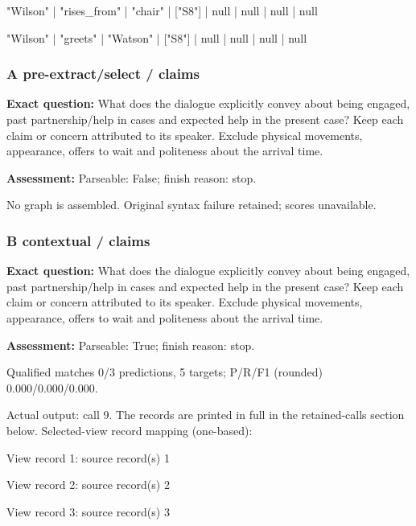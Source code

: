 "Wilson" | "rises\_from" | "chair" | ["S8"] | null | null | null | null\par\smallskip

"Wilson" | "greets" | "Watson" | ["S8"] | null | null | null | null\par\smallskip

\subsubsection*{A pre-extract/select / claims}

\noindent\textbf{Exact question:} What does the dialogue explicitly convey about being engaged, past partnership/help in cases and expected help in the present case? Keep each claim or concern attributed to its speaker. Exclude physical movements, appearance, offers to wait and politeness about the arrival time.\par

\noindent\textbf{Assessment:} Parseable: False; finish reason: stop.

\noindent No graph is assembled. Original syntax failure retained; scores unavailable.

\subsubsection*{B contextual / claims}

\noindent\textbf{Exact question:} What does the dialogue explicitly convey about being engaged, past partnership/help in cases and expected help in the present case? Keep each claim or concern attributed to its speaker. Exclude physical movements, appearance, offers to wait and politeness about the arrival time.\par

\noindent\textbf{Assessment:} Parseable: True; finish reason: stop.

Qualified matches 0/3 predictions, 5 targets; P/R/F1 (rounded) 0.000/0.000/0.000.\par

Actual output: call 9. The records are printed in full in the retained-calls section below. Selected-view record mapping (one-based):

View record 1: source record(s) 1\par

View record 2: source record(s) 2\par

View record 3: source record(s) 3\par

